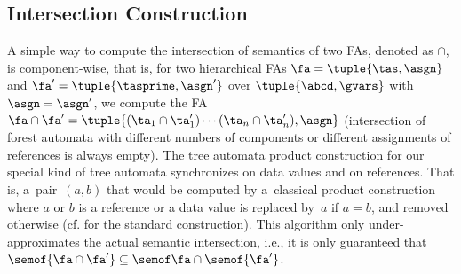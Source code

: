 \subsection{Intersection Construction}
A simple way to compute 
%
the intersection of semantics of two FAs, denoted as $\cap$, is com\-po\-nent-wise, 
that is, for two hierarchical FAs $\fa = \tuple{\tas,\asgn}$ and $\fa' = \tuple{\tasprime,\asgn'}$ over $\tuple{\abcd, \gvars}$ with $\asgn=\asgn'$,
we compute the FA $\fa\cap\fa' =
\tuple{(\ta_1\cap\ta_1')\cdots(\ta_n\cap\ta_n'), \asgn}$ (intersection of forest automata with different numbers of components or different assignments of references is always empty).
%
The tree automata product construction for our special kind of tree automata
synchronizes on data values and on references.
That is, a~pair~$(a,b)$ that would be computed by a~classical product
construction where $a$ or $b$ is a reference or a data value is replaced by~$a$
if $a = b$, and removed otherwise (cf. \cite{tata} for the standard construction).
%
This  algorithm only under-approximates the actual semantic intersection, i.e., it is only guaranteed that $\semof{\fa\cap\fa'}\subseteq\semof\fa\cap \semof{\fa'}$.

